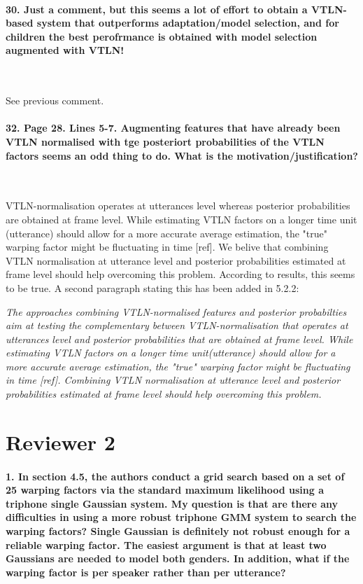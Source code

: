 \documentclass[]{article}
\begin{document}
\paragraph{30. Just a comment, but this seems a lot of effort to obtain a VTLN-based system that outperforms adaptation/model selection, and for children the best perofrmance is obtained with model selection augmented with VTLN!}

~

See previous comment.

\paragraph{32. Page 28. Lines 5-7. Augmenting features that have already been VTLN normalised with tge posteriort probabilities of the VTLN factors seems an odd thing to do. What is the motivation/justification?}

~

VTLN-normalisation operates at utterances level whereas posterior probabilities are obtained at frame level. While estimating VTLN factors on a longer time unit (utterance) should allow for a more accurate average estimation, the "true" warping factor might be fluctuating in time [ref]. We belive that combining VTLN normalisation at utterance level and posterior probabilities estimated at frame level should help overcoming this problem. According to results, this seems to be true. A second paragraph stating this has been added in 5.2.2:

\textit{The approaches combining VTLN-normalised features and posterior probabilties aim at testing the complementary between VTLN-normalisation that operates at utterances level and posterior probabilities that are obtained at frame level. While estimating VTLN factors on a longer time unit(utterance) should allow for a more accurate average estimation, the "true" warping factor might be fluctuating in time [ref]. Combining VTLN normalisation at utterance level and posterior probabilities estimated at frame level should help overcoming this problem.}


\section{Reviewer 2}

\paragraph{1. In section 4.5, the authors conduct a grid search based on a set of 25 warping factors via the standard maximum likelihood using a triphone single Gaussian system. My question is that are there any difficulties in using a more robust triphone GMM system to search the warping factors? Single Gaussian is definitely not robust enough for a reliable warping factor. The easiest argument is that at least two Gaussians are needed to model both genders. In addition, what if the warping factor is per speaker rather than per utterance?}
\end{document}
